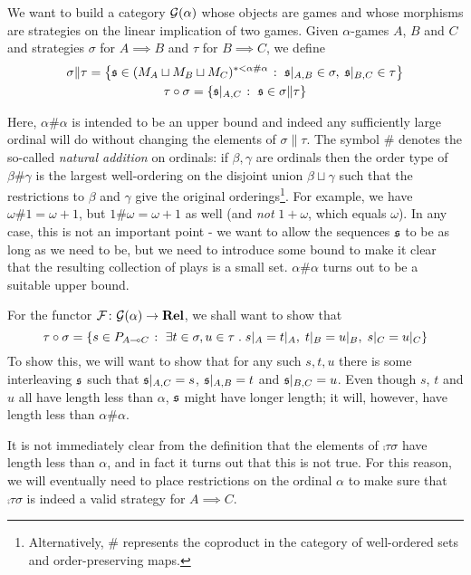 \documentclass[11pt]{article} %
\begin{document}
We want to build a category $\mathcal G(\alpha)$ whose objects are games and whose morphisms are strategies on the linear implication of two games.  Given $\alpha$-games $A$, $B$ and $C$ and strategies $\sigma$ for $A\implies B$ and $\tau$ for $B\implies C$, we define
\begin{gather*}
  \sigma\|\tau = \left\{\mathfrak s\in (M_A\sqcup M_B\sqcup M_C)^{*<\alpha\#\alpha}\;\colon\; \mathfrak s\vert_{A,B}\in\sigma,\;\mathfrak s\vert_{B,C}\in\tau\right\}\\
  \tau \circ \sigma = \{\mathfrak s\vert_{A,C}\;\colon\; \mathfrak s\in\sigma\|\tau\}
\end{gather*}

Here, $\alpha\#\alpha$ is intended to be an upper bound and indeed any sufficiently large ordinal will do without changing the elements of $\sigma\|\tau$.  The symbol $\#$ denotes the so-called \emph{natural addition} on ordinals: if $\beta,\gamma$ are ordinals then the order type of $\beta\#\gamma$ is the largest well-ordering on the disjoint union $\beta\sqcup\gamma$ such that the restrictions to $\beta$ and $\gamma$ give the original orderings\footnote{Alternatively, $\#$ represents the coproduct in the category of well-ordered sets and order-preserving maps.}.  For example, we have $\omega\#1=\omega+1$, but $1\#\omega=\omega+1$ as well (and \emph{not} $1+\omega$, which equals $\omega$).  In any case, this is not an important point - we want to allow the sequences $\mathfrak s$ to be as long as we need to be, but we need to introduce some bound to make it clear that the resulting collection of plays is a small set.  $\alpha\#\alpha$ turns out to be a suitable upper bound.

For the functor $\mathcal F\colon{}\mathcal G(\alpha)\to{}{\normalfont\textbf{Rel}}$, we shall want to show that
\[
  \tau \circ \sigma = \left\{s\in P_{A\multimap C}\;\colon\;\exists t\in\sigma,u\in\tau\;.\; s\vert_A=t\vert_A,\;t\vert_B=u\vert_B,\;s\vert_C=u\vert_C\right\}
  \]
To show this, we will want to show that for any such $s,t,u$ there is some interleaving $\mathfrak s$ such that $\mathfrak s\vert_{A,C}=s$, $\mathfrak s\vert_{A,B}=t$ and $\mathfrak s\vert_{B,C}=u$.  Even though $s$, $t$ and $u$ all have length less than $\alpha$, $\mathfrak s$ might have longer length; it will, however, have length less than $\alpha\#\alpha$.

It is not immediately clear from the definition that the elements of $\comp\tau\sigma$ have length less than $\alpha$, and in fact it turns out that this is not true.  For this reason, we will eventually need to place restrictions on the ordinal $\alpha$ to make sure that $\comp\tau\sigma$ is indeed a valid strategy for $A\implies C$.  
\end{document}
